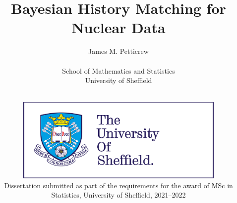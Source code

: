 


\title{Bayesian History Matching for Nuclear Data}
\author{James M. Petticrew
\\$~$\vspace{0.5in}\\
School of Mathematics and Statistics\\
University of Sheffield}

\date{$~$\vspace{1.5in}\\
\includegraphics[width=4in]{figures/logo.jpg}\\
\vfill Dissertation submitted as part of the requirements for the award of MSc in Statistics, University of Sheffield, 2021--2022\\
}

\maketitle
